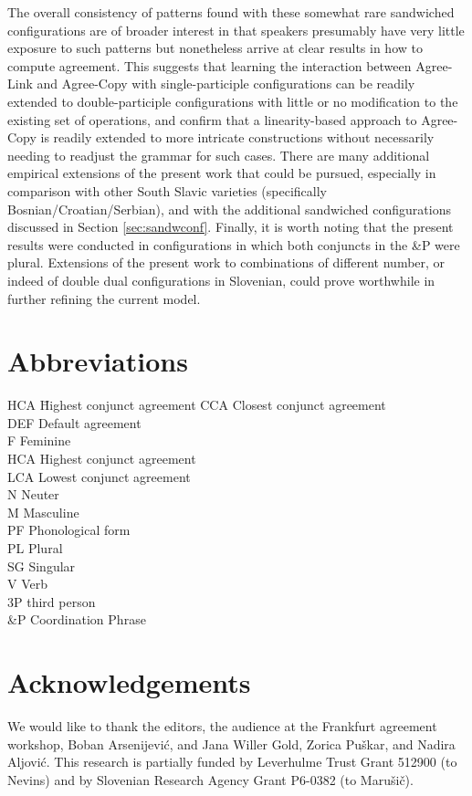\documentclass[output=paper
,modfonts
,nonflat]{langsci/langscibook}
\begin{document}
The overall consistency of patterns found with these somewhat rare sandwiched configurations are of broader interest in that speakers presumably have very little exposure to such patterns but nonetheless arrive at clear results in how to compute agreement. This suggests that learning the interaction between Agree-Link and Agree-Copy with single-participle configurations can be readily extended to double-participle configurations with little or no modification to the existing set of operations, and confirm that a linearity-based approach to Agree-Copy is readily extended to more intricate constructions without necessarily needing to readjust the grammar for such cases. There are many additional empirical extensions of the present work that could be pursued, especially in comparison with other South Slavic varieties (specifically Bosnian/Croatian/Serbian), and with the additional sandwiched configurations discussed in Section \ref{sec:sandwconf}. Finally, it is worth noting that the present results were conducted in configurations in which both conjuncts in the \&P were plural. Extensions of the present work to combinations of different number, or indeed of double dual configurations in Slovenian, could prove worthwhile in further refining the current model.


\section*{Abbreviations}

\begin{multicols}{2}
	\begin{tabbing}
		{HCA}\hspace{5mm} \= Highest conjunct agreement\kill
CCA \> Closest conjunct agreement\\
DEF \> Default agreement\\
F \> Feminine\\
HCA \> Highest conjunct agreement\\
LCA \> Lowest conjunct agreement\\
N \> Neuter\\
M \> Masculine\\
PF \> Phonological form\\
PL \> Plural\\
SG \> Singular\\
V \> Verb\\
3P \> third person\\
\&P \> Coordination Phrase
	\end{tabbing} 
\end{multicols}

\section*{Acknowledgements}
We would like to thank the editors, the audience at the Frankfurt agreement workshop, Boban Arsenijević, and Jana Willer Gold, Zorica Puškar, and Nadira Aljović. This research is partially funded by Leverhulme Trust Grant 512900 (to Nevins) and by Slovenian Research Agency Grant P6-0382 (to Marušič). 


{\sloppy\printbibliography[heading=subbibliography,notkeyword=this]}
\end{document}
